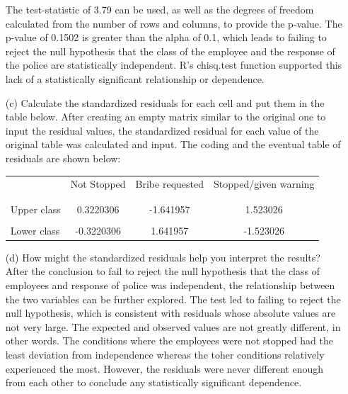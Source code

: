 \documentclass[12pt,letterpaper]{article}
\begin{document}
\begin{enumerate}
	The test-statistic of 3.79 can be used, as well as the degrees of freedom calculated from the number of rows and columns, to provide the p-value. The p-value of 0.1502 is greater than the alpha of 0.1, which leads to failing to reject the null hypothesis that the class of the employee and the response of the police are statistically independent. R's chisq.test function supported this lack of a statistically significant relationship or dependence.
	 
	\vspace{.5 cm}
	\item [(c)] Calculate the standardized residuals for each cell and put them in the table below.
	After creating an empty matrix similar to the original one to input the residual values, the standardized residual for each value of the original table was calculated and input. The coding and the eventual table of residuals are shown below: 
	 
	\vspace{1cm}
	
	\begin{table}[h]
		\centering
		\begin{tabular}{l | c c c }
			& Not Stopped & Bribe requested & Stopped/given warning \\
			\\[-1.8ex] 
			\hline \\[-1.8ex]
			Upper class  & 0.3220306 & -1.641957 & 1.523026  \\
			\\
			Lower class & -0.3220306 & 1.641957  & -1.523026  \\
			
		\end{tabular}
	\end{table}
	
	
	\vspace{.5cm}
	\item [(d)] How might the standardized residuals help you interpret the results?  
	After the conclusion to fail to reject the null hypothesis that the class of employees and response of police was independent, the relationship between the two variables can be further explored. The test led to failing to reject the null hypothesis, which is consistent with residuals whose absolute values are not very large. The expected and observed values are not greatly different, in other words. The conditions where the employees were not stopped had the least deviation from independence whereas the toher conditions relatively experienced the most. However, the residuals were never different enough from each other to conclude any statistically significant dependence.
	\vspace{.5 cm}
	


	
\end{enumerate}
\newpage
\end{document}
